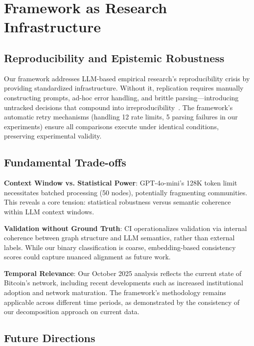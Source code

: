 \documentclass[conference]{IEEEtran}
\begin{document}
\section{Framework as Research Infrastructure}\label{sec:framework-role}

\subsection{Reproducibility and Epistemic Robustness}

Our framework addresses LLM-based empirical research's reproducibility crisis by providing standardized infrastructure. Without it, replication requires manually constructing prompts, ad-hoc error handling, and brittle parsing—introducing untracked decisions that compound into irreproducibility~\cite{gelman2013garden}. The framework's automatic retry mechanisms (handling 12 rate limits, 5 parsing failures in our experiments) ensure all comparisons execute under identical conditions, preserving experimental validity.

\subsection{Fundamental Trade-offs}

\textbf{Context Window vs. Statistical Power}: GPT-4o-mini's 128K token limit necessitates batched processing (50 nodes), potentially fragmenting communities. This reveals a core tension: statistical robustness versus semantic coherence within LLM context windows.

\textbf{Validation without Ground Truth}: CI operationalizes validation via internal coherence between graph structure and LLM semantics, rather than external labels. While our binary classification is coarse, embedding-based consistency scores could capture nuanced alignment as future work.

\textbf{Temporal Relevance}: Our October 2025 analysis reflects the current state of Bitcoin's network, including recent developments such as increased institutional adoption and network maturation. The framework's methodology remains applicable across different time periods, as demonstrated by the consistency of our decomposition approach on current data.

\subsection{Future Directions}
\end{document}
